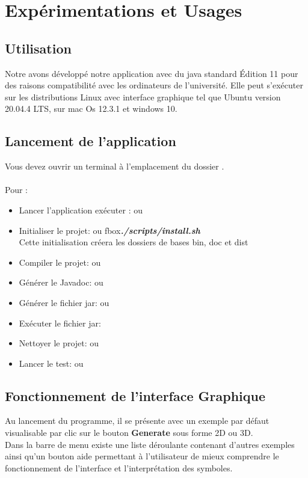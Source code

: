 \chapter{Expérimentations et Usages}
\section{Utilisation}
	Notre avons développé notre application avec du java standard Édition 11 pour des raisons compatibilité avec les ordinateurs de l'université. Elle peut s'exécuter sur les distributions Linux avec interface graphique tel que Ubuntu version 20.04.4 LTS, sur mac Os 12.3.1 et windows 10.
	
\section{Lancement de l'application}
 	Vous devez ouvrir un terminal à l'emplacement du dossier .
 	\\ \\
 	Pour :
 	\begin{itemize}
 		\item Lancer l'application exécuter :  ou 
 		\item Initialiser le projet:   ou fbox{\textbf{\em ./scripts/install.sh}} \\
 			Cette initialisation créera  les dossiers de bases  bin, doc et dist 
 		\item Compiler le projet:  ou 
 		\item Générer le Javadoc:  ou 		
 		\item Générer le fichier jar:  ou 
 		\item Exécuter le fichier jar:
 		\item Nettoyer le projet:  ou 
 		\item Lancer le test:  ou 
	\end{itemize} 		
 	
\section{Fonctionnement de l'interface Graphique}
	Au lancement du programme, il se présente avec un exemple par défaut visualisable  
par clic sur le bouton \textbf{Generate} sous forme 2D ou 3D.\\
	Dans la barre de menu existe une liste déroulante contenant d'autres exemples ainsi qu'un bouton aide permettant à l'utilisateur de mieux comprendre le fonctionnement de l'interface et l'interprétation des symboles.

